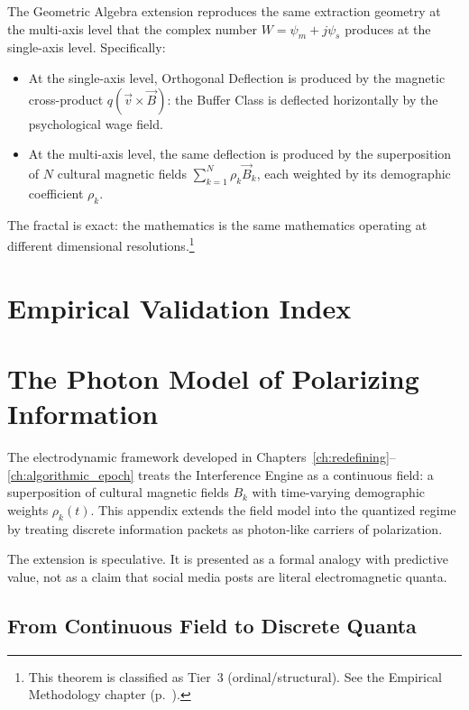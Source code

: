 \begin{theorem}
The Geometric Algebra extension reproduces the same extraction geometry at the multi-axis level that the complex number $W = \psi_m + j\psi_s$ produces at the single-axis level. Specifically:
\begin{itemize}
\item At the single-axis level, Orthogonal Deflection is produced by the magnetic cross-product $q(\vec{v} \times \vec{B})$: the Buffer Class is deflected horizontally by the psychological wage field.
\item At the multi-axis level, the same deflection is produced by the superposition of $N$ cultural magnetic fields $\sum_{k=1}^{N} \rho_k \vec{B}_k$, each weighted by its demographic coefficient $\rho_k$.
\end{itemize}
The fractal is exact: the mathematics is the same mathematics operating at different dimensional resolutions.\footnote{This theorem is classified as Tier~3 (ordinal/structural). See the Empirical Methodology chapter (p.~\pageref{ch:empirical_methodology}).}
\end{theorem}

\chapter*{Empirical Validation Index}
\label{app:empirical_index}



\chapter{The Photon Model of Polarizing Information}
\label{app:photon_model}

The electrodynamic framework developed in Chapters~\ref{ch:redefining}--\ref{ch:algorithmic_epoch} treats the Interference Engine as a continuous field: a superposition of cultural magnetic fields $B_k$ with time-varying demographic weights $\rho_k(t)$. This appendix extends the field model into the quantized regime by treating discrete information packets as photon-like carriers of polarization.

The extension is speculative. It is presented as a formal analogy with predictive value, not as a claim that social media posts are literal electromagnetic quanta.

\section{From Continuous Field to Discrete Quanta}

